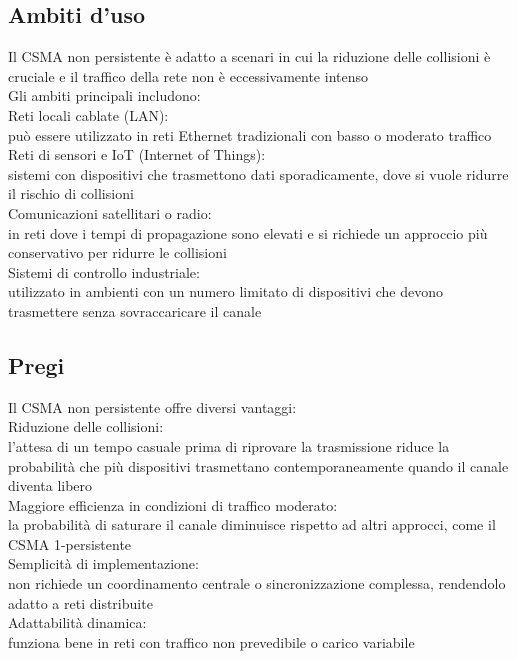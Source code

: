 \documentclass[10pt,oneside,a4paper]{article}
\begin{document}
\subsection{Ambiti d'uso}
Il CSMA non persistente è adatto a scenari in cui la riduzione delle collisioni è cruciale e il traffico della rete non è eccessivamente intenso\\
Gli ambiti principali includono:\\
Reti locali cablate (LAN):\\
può essere utilizzato in reti Ethernet tradizionali con basso o moderato traffico\\
Reti di sensori e IoT (Internet of Things):\\
sistemi con dispositivi che trasmettono dati sporadicamente, dove si vuole ridurre il rischio di collisioni\\
Comunicazioni satellitari o radio:\\
in reti dove i tempi di propagazione sono elevati e si richiede un approccio più conservativo per ridurre le collisioni\\
Sistemi di controllo industriale:\\
utilizzato in ambienti con un numero limitato di dispositivi che devono trasmettere senza sovraccaricare il canale
\subsection{Pregi}
Il CSMA non persistente offre diversi vantaggi:\\
Riduzione delle collisioni:\\
l’attesa di un tempo casuale prima di riprovare la trasmissione riduce la probabilità che più dispositivi trasmettano contemporaneamente quando il canale diventa libero\\
Maggiore efficienza in condizioni di traffico moderato:\\
la probabilità di saturare il canale diminuisce rispetto ad altri approcci, come il CSMA 1-persistente\\
Semplicità di implementazione:\\
non richiede un coordinamento centrale o sincronizzazione complessa, rendendolo adatto a reti distribuite\\
Adattabilità dinamica:\\
funziona bene in reti con traffico non prevedibile o carico variabile
\end{document}
